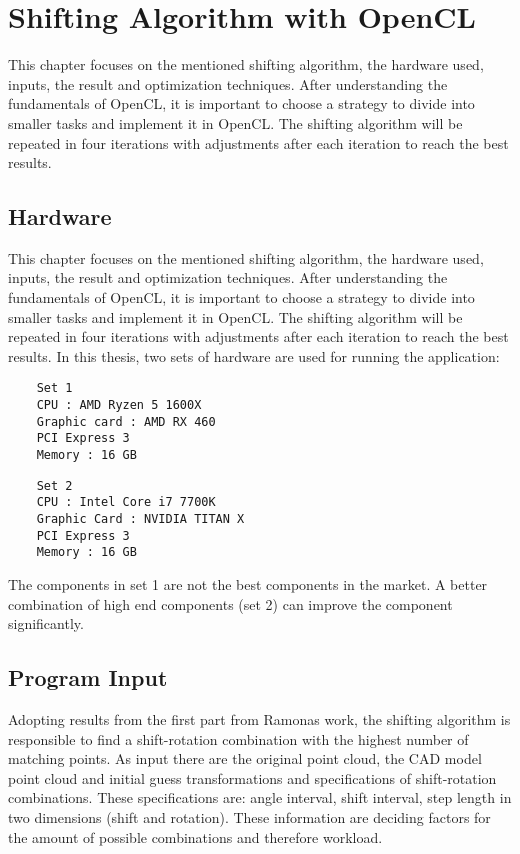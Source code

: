 \chapter{Shifting Algorithm with OpenCL}
This chapter focuses on the mentioned shifting algorithm, the hardware used, inputs, the result and optimization techniques. After understanding the fundamentals of OpenCL, it is important to choose a strategy to divide into smaller tasks and implement it in OpenCL. The shifting algorithm will be repeated in four iterations with adjustments after each iteration to reach the best results. 

\section{Hardware}
This chapter focuses on the mentioned shifting algorithm, the hardware used, inputs, the result and optimization techniques. After understanding the fundamentals of OpenCL, it is important to choose a strategy to divide into smaller tasks and implement it in OpenCL. The shifting algorithm will be repeated in four iterations with adjustments after each iteration to reach the best results. In this thesis, two sets of hardware are used for running the application:

\begin{lstlisting}
	Set 1    
    CPU : AMD Ryzen 5 1600X
    Graphic card : AMD RX 460
    PCI Express 3
    Memory : 16 GB

\end{lstlisting}

\begin{lstlisting}
	Set 2    
    CPU : Intel Core i7 7700K
    Graphic Card : NVIDIA TITAN X
    PCI Express 3
    Memory : 16 GB

\end{lstlisting}

The components in set 1 are not the best components in the market. A better combination of high end components (set 2) can improve the component significantly. 

\newpage
\section{Program Input}
Adopting results from the first part from Ramonas work, the shifting algorithm is responsible to find a shift-rotation combination with the highest number of matching points. As input there are the original point cloud, the CAD model point cloud and initial guess transformations and specifications of shift-rotation combinations. These specifications are: angle interval, shift interval, step length in two dimensions (shift and rotation). These information are deciding factors for the amount of possible combinations and therefore workload.


